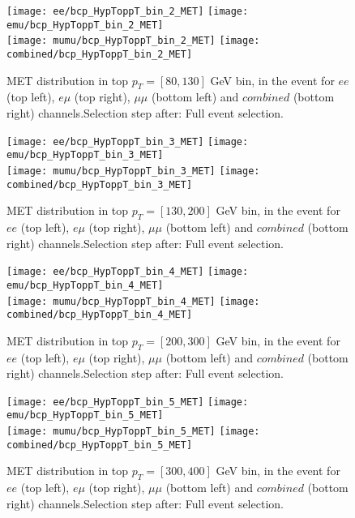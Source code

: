 \documentclass[12pt, a4paper, titlepage]{article}
\begin{document}
\clearpage
\newpage


\begin{figure}
  \texttt{[image: ee/bcp\_HypToppT\_bin\_2\_MET]}
  \texttt{[image: emu/bcp\_HypToppT\_bin\_2\_MET]}\\
  \texttt{[image: mumu/bcp\_HypToppT\_bin\_2\_MET]}
  \texttt{[image: combined/bcp\_HypToppT\_bin\_2\_MET]}
\caption{MET distribution in top $p_T = [80,130]$ GeV bin, in the event for $ee$ (top left), $e\mu$ (top right), $\mu\mu$ (bottom left) and $combined$ (bottom right) channels.\newline Selection step after: Full event selection.}
\end{figure}

\clearpage
\newpage


\begin{figure}
  \texttt{[image: ee/bcp\_HypToppT\_bin\_3\_MET]}
  \texttt{[image: emu/bcp\_HypToppT\_bin\_3\_MET]}\\
  \texttt{[image: mumu/bcp\_HypToppT\_bin\_3\_MET]}
  \texttt{[image: combined/bcp\_HypToppT\_bin\_3\_MET]}
\caption{MET distribution in top $p_T = [130,200]$ GeV bin, in the event for $ee$ (top left), $e\mu$ (top right), $\mu\mu$ (bottom left) and $combined$ (bottom right) channels.\newline Selection step after: Full event selection.}
\end{figure}

\clearpage
\newpage

\begin{figure}
  \texttt{[image: ee/bcp\_HypToppT\_bin\_4\_MET]}
  \texttt{[image: emu/bcp\_HypToppT\_bin\_4\_MET]}\\
  \texttt{[image: mumu/bcp\_HypToppT\_bin\_4\_MET]}
  \texttt{[image: combined/bcp\_HypToppT\_bin\_4\_MET]}
\caption{MET distribution in top $p_T = [200,300]$ GeV bin, in the event for $ee$ (top left), $e\mu$ (top right), $\mu\mu$ (bottom left) and $combined$ (bottom right) channels.\newline Selection step after: Full event selection.}
\end{figure}

\clearpage
\newpage


\begin{figure}
  \texttt{[image: ee/bcp\_HypToppT\_bin\_5\_MET]}
  \texttt{[image: emu/bcp\_HypToppT\_bin\_5\_MET]}\\
  \texttt{[image: mumu/bcp\_HypToppT\_bin\_5\_MET]}
  \texttt{[image: combined/bcp\_HypToppT\_bin\_5\_MET]}
\caption{MET distribution in top $p_T = [300,400]$ GeV bin, in the event for $ee$ (top left), $e\mu$ (top right), $\mu\mu$ (bottom left) and $combined$ (bottom right) channels.\newline Selection step after: Full event selection.}
\end{figure}
\end{document}
